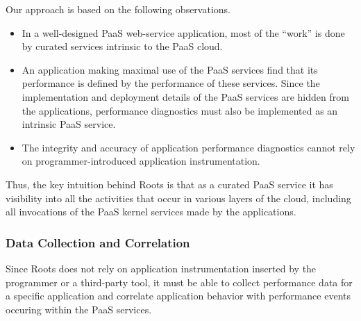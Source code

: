 Our approach is based on the following observations.
\begin{itemize}
\item In a well-designed PaaS web-service application, 
most of the ``work'' is done by
curated services intrinsic to the PaaS cloud.  
\item An application making maximal use of the PaaS services find that its
performance is defined by the performance of these services.  Since the 
implementation and deployment details of the PaaS services are hidden
from the applications,
performance diagnostics must also be implemented as an intrinsic PaaS service.
\item The integrity and accuracy of application performance diagnostics
cannot rely on programmer-introduced application instrumentation.
\end{itemize}
Thus, the key intuition behind Roots is that as a curated PaaS service
it has visibility into all the activities that occur in various layers of the cloud,
including all invocations of the PaaS kernel services made by the applications.

%

\subsubsection{Data Collection and Correlation}

Since Roots does not rely on application instrumentation inserted by the
programmer or a third-party tool, it must be able to collect performance data
for a specific application and correlate application behavior with performance
events occuring within the PaaS services.
 
